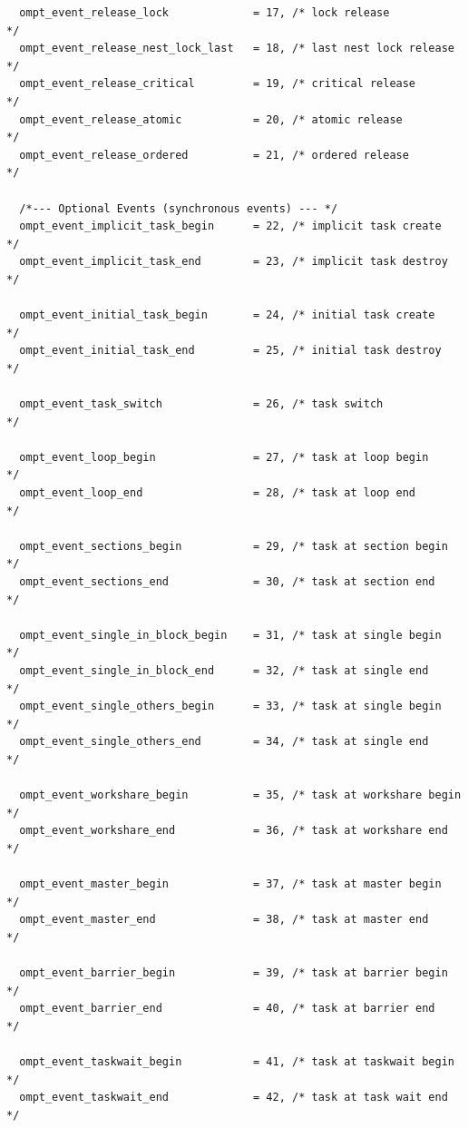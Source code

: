 \documentclass{article}
\begin{document}
{\begin{verbatim}
  ompt_event_release_lock             = 17, /* lock release               */
  ompt_event_release_nest_lock_last   = 18, /* last nest lock release     */
  ompt_event_release_critical         = 19, /* critical release           */
  ompt_event_release_atomic           = 20, /* atomic release             */
  ompt_event_release_ordered          = 21, /* ordered release            */

  /*--- Optional Events (synchronous events) --- */        	    
  ompt_event_implicit_task_begin      = 22, /* implicit task create       */
  ompt_event_implicit_task_end        = 23, /* implicit task destroy      */
  
  ompt_event_initial_task_begin       = 24, /* initial task create        */
  ompt_event_initial_task_end         = 25, /* initial task destroy       */
				    
  ompt_event_task_switch              = 26, /* task switch                */
				    				    
  ompt_event_loop_begin               = 27, /* task at loop begin         */
  ompt_event_loop_end                 = 28, /* task at loop end           */
  
  ompt_event_sections_begin           = 29, /* task at section begin      */
  ompt_event_sections_end             = 30, /* task at section end        */
  
  ompt_event_single_in_block_begin    = 31, /* task at single begin       */
  ompt_event_single_in_block_end      = 32, /* task at single end         */
  ompt_event_single_others_begin      = 33, /* task at single begin       */
  ompt_event_single_others_end        = 34, /* task at single end         */
	
  ompt_event_workshare_begin          = 35, /* task at workshare begin    */		              	 			    
  ompt_event_workshare_end            = 36, /* task at workshare end      */	
	              	 			    
  ompt_event_master_begin             = 37, /* task at master begin       */
  ompt_event_master_end               = 38, /* task at master end         */
  
  ompt_event_barrier_begin            = 39, /* task at barrier begin      */
  ompt_event_barrier_end              = 40, /* task at barrier end        */
  
  ompt_event_taskwait_begin           = 41, /* task at taskwait begin     */
  ompt_event_taskwait_end             = 42, /* task at task wait end      */
  

\end{verbatim}}
\end{document}
